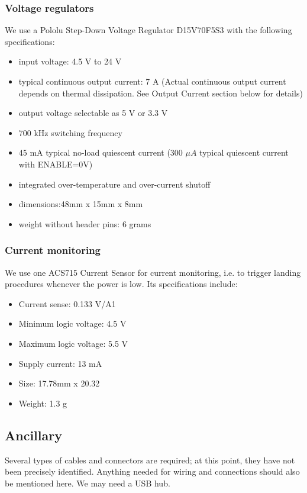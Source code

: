 \documentclass[a4paper, 10pt, twocolumn, titlepage]{article}
\begin{document}
\subsubsection{Voltage regulators}
We use a Pololu Step-Down Voltage Regulator D15V70F5S3 with the following specifications:
\begin{itemize}
\itemsep-1mm
  \item input voltage: 4.5 V to 24 V
  \item typical continuous output current: 7 A (Actual continuous output current depends on thermal dissipation. See Output Current section below for details)
  \item output voltage selectable as 5 V or 3.3 V
  \item 700 kHz switching frequency
  \item 45 mA typical no-load quiescent current (300 $\mu A$ typical quiescent current with ENABLE=0V)
  \item integrated over-temperature and over-current shutoff
  \item dimensions:48mm x 15mm x 8mm
  \item weight without header pins: 6 grams
\end{itemize}

\subsubsection{Current monitoring}
We use one ACS715 Current Sensor for current monitoring, i.e. to trigger landing procedures whenever the power is low.
Its specifications include:
\begin{itemize}
\itemsep-1mm
  \item Current sense:	 0.133 V/A1
  \item Minimum logic voltage:	 4.5 V
  \item Maximum logic voltage:	 5.5 V
  \item Supply current:	 13 mA
  \item Size:	 17.78mm x 20.32
  \item Weight:	 1.3 g
\end{itemize}

\subsection{Ancillary}
Several types of cables and connectors are required; at this point, they have not been precisely identified.
Anything needed for wiring and connections should also be mentioned here.
We may need a USB hub.
\end{document}
